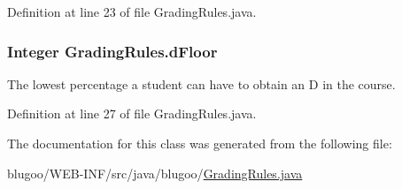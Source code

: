 Definition at line 23 of file GradingRules.java.\hypertarget{classGradingRules_aa2a35bd471a7ae909bd388875552565}{
\subsubsection{\setlength{\rightskip}{0pt plus 5cm}Integer {\bf GradingRules.dFloor}}}
\label{classGradingRules_aa2a35bd471a7ae909bd388875552565}


The lowest percentage a student can have to obtain an D in the course. 



Definition at line 27 of file GradingRules.java.

The documentation for this class was generated from the following file:\begin{CompactItemize}
\item 
blugoo/WEB-INF/src/java/blugoo/\hyperlink{GradingRules_8java}{GradingRules.java}\end{CompactItemize}
